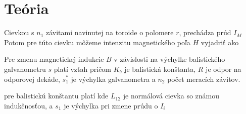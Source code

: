 \section{Teória}
Cievkou s $n_1$ závitami navinutej na toroide o polomere $r$, prechádza prúd $I_M$ 
Potom pre túto cievku môžeme intenzitu magnetického poľa $H$ vyjadriť ako

Pre zmenu magnetickej indukcie $B$ v závislosti na výchylke balistického galvanometru $s$ platí vzťah 
pričom $K_b$ je balistická konštanta, $R$ je odpor na odporovej dekáde, $s_1^{*}$ je výchylka galvanometra a $n_2$ počet meracích závitov. 

pre balistickú konštantu platí 
kde $L_{12}$ je normálová cievka so známou indukčnosťou, a $s_1$ je výchylka pri zmene prúdu o $I_i$



